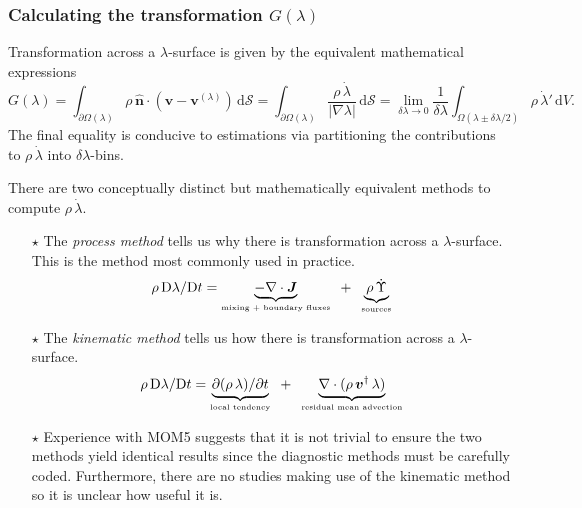 \documentclass[10pt]{beamer}
\begin{document}
\begin{frame}
  \frametitle{Calculating the transformation $G(\lambda)$}
\scriptsize 
 
\begin{exampleblock}{}

Transformation across a $\lambda$-surface is given by the equivalent
mathematical expressions
\begin{equation*}
 G(\lambda) 
 = \int_{\partial \Omega(\lambda) } \rho \,  \hat{\bm n} \cdot ({\bm v} -{\bm v}^{(\lambda)} )   \, \mathrm{d}\mathcal{S}
 = \int_{\partial \Omega(\lambda)} \frac{\rho \, \dot{\lambda}}{|\nabla \lambda|} \, \mathrm{d}\mathcal{S}
 = \lim_{\delta \lambda \rightarrow 0}
 \frac{1}{\delta \lambda}
 \int_{\Omega(\lambda \pm \delta \lambda/2)} \rho \, \dot{\lambda}' \, \mathrm{d}V.
\end{equation*}
The final equality is conducive to estimations via partitioning the
contributions to $\rho \, \dot{\lambda}$ into $\delta \lambda$-bins.

\end{exampleblock}

There are two conceptually distinct but mathematically equivalent
methods to compute $\rho \, \dot{\lambda}$.
\begin{itemize}

\item[$\star$] The {\it process method} tells us why there is
  transformation across a $\lambda$-surface.  This is the method most
  commonly used in practice.
\begin{equation*}
 \rho \, \mathrm{D}\lambda/ \mathrm{D}t 
   = \underbrace{-\nabla \cdot {\bm J}}_{\mbox{\tiny mixing + boundary fluxes}} \; \; 
   + \; \; \underbrace{\rho \, \dot{\Upsilon}}_{\mbox{\tiny sources}}
\end{equation*}

\item[$\star$] The {\it kinematic method} tells us how there is
  transformation across a $\lambda$-surface.
\begin{equation*}
 \rho \, \mathrm{D}\lambda/\mathrm{D}t 
 = \underbrace{\partial (\rho \, \lambda)/\partial t}_{\mbox{\tiny local tendency}}
  \; \; 
  + 
 \; \;  \underbrace{\nabla \cdot (\rho \, {\bm v}^{\dagger} \, \lambda)}_{\mbox{\tiny residual mean advection}} 
\end{equation*}
 
\item[$\star$] Experience with MOM5 suggests that it is not trivial to
  ensure the two methods yield identical results since the diagnostic
  methods must be carefully coded.  Furthermore, there are no studies
  making use of the kinematic method so it is unclear how useful it
  is.  


\end{itemize}
\end{frame}
\end{document}
